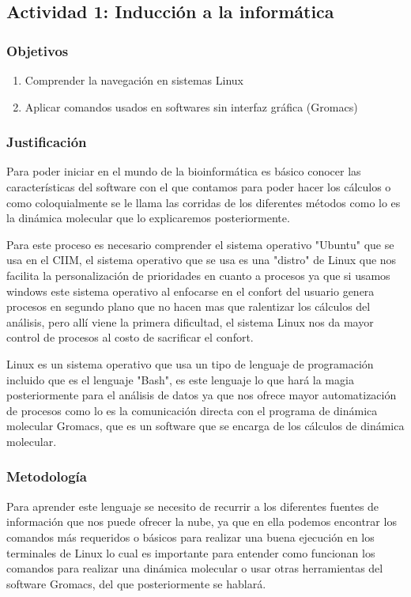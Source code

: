\documentclass[a4paper, 12pt]{article}
\begin{document}
    \subsection{Actividad 1: Inducción a la informática}

        \subsubsection {Objetivos}
            \begin{enumerate}
                \item Comprender la navegación en sistemas Linux
                \item Aplicar comandos usados en softwares sin interfaz gráfica (Gromacs)
            \end{enumerate}

        \subsubsection {Justificación}
        Para poder iniciar en el mundo de la bioinformática es básico conocer las características del software con el que contamos para poder hacer los cálculos o como coloquialmente se le llama las corridas de los diferentes métodos como lo es la dinámica molecular que lo explicaremos posteriormente. 

        Para este proceso es necesario comprender el sistema operativo "Ubuntu" que se usa en el CIIM, el sistema operativo que se usa es una "distro" de Linux que nos facilita la personalización de prioridades en cuanto a procesos ya que si usamos windows este sistema operativo al enfocarse en el confort del usuario genera procesos en segundo plano que no hacen mas que ralentizar los cálculos del análisis, pero allí viene la primera dificultad, el sistema Linux nos da mayor control de procesos al costo de sacrificar el confort.
    
        Linux es un sistema operativo que usa un tipo de lenguaje de programación incluido que es el lenguaje "Bash", es este lenguaje lo que hará la magia posteriormente para el análisis de datos ya que nos ofrece mayor automatización de procesos como lo es la comunicación directa con el programa de dinámica molecular Gromacs, que es un software que se encarga de  los cálculos de dinámica molecular.

        \subsubsection {Metodología}
        Para aprender este lenguaje se necesito de recurrir a los diferentes fuentes de información que nos puede ofrecer la nube, ya que en ella podemos encontrar los comandos más requeridos o básicos para realizar una buena ejecución en los terminales de Linux lo cual es importante para entender como funcionan los comandos para realizar una dinámica molecular o usar otras herramientas del software Gromacs, del que posteriormente se hablará.
        
\end{document}
